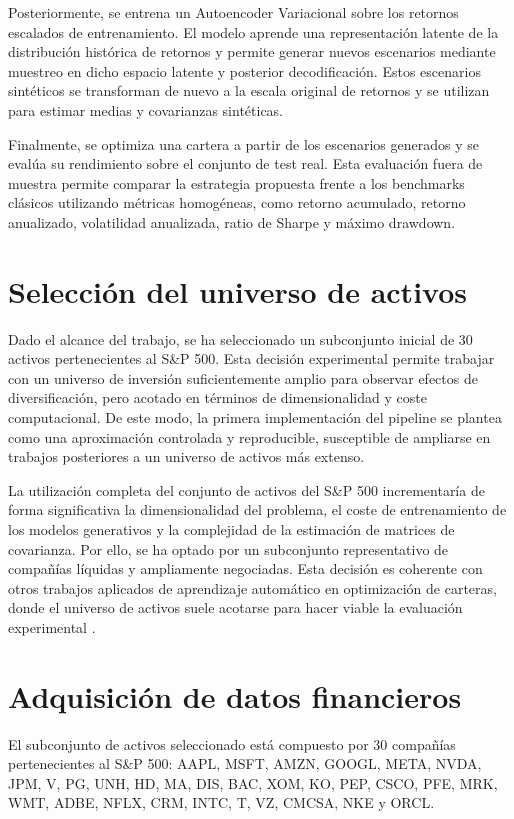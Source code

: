 Posteriormente, se entrena un Autoencoder Variacional sobre los retornos escalados de entrenamiento. El modelo aprende una representación latente de la distribución histórica de retornos y permite generar nuevos escenarios mediante muestreo en dicho espacio latente y posterior decodificación. Estos escenarios sintéticos se transforman de nuevo a la escala original de retornos y se utilizan para estimar medias y covarianzas sintéticas.

Finalmente, se optimiza una cartera a partir de los escenarios generados y se evalúa su rendimiento sobre el conjunto de test real. Esta evaluación fuera de muestra permite comparar la estrategia propuesta frente a los benchmarks clásicos utilizando métricas homogéneas, como retorno acumulado, retorno anualizado, volatilidad anualizada, ratio de Sharpe y máximo drawdown.

\section{Selección del universo de activos}

Dado el alcance del trabajo, se ha seleccionado un subconjunto inicial de 30 activos pertenecientes al S\&P 500. Esta decisión experimental permite trabajar con un universo de inversión suficientemente amplio para observar efectos de diversificación, pero acotado en términos de dimensionalidad y coste computacional. De este modo, la primera implementación del pipeline se plantea como una aproximación controlada y reproducible, susceptible de ampliarse en trabajos posteriores a un universo de activos más extenso.

La utilización completa del conjunto de activos del S\&P 500 incrementaría de forma significativa la dimensionalidad del problema, el coste de entrenamiento de los modelos generativos y la complejidad de la estimación de matrices de covarianza. Por ello, se ha optado por un subconjunto representativo de compañías líquidas y ampliamente negociadas. Esta decisión es coherente con otros trabajos aplicados de aprendizaje automático en optimización de carteras, donde el universo de activos suele acotarse para hacer viable la evaluación experimental \cite{zhang2020deep}.

\section{Adquisición de datos financieros}

El subconjunto de activos seleccionado está compuesto por 30 compañías pertenecientes al S\&P 500: AAPL, MSFT, AMZN, GOOGL, META, NVDA, JPM, V, PG, UNH, HD, MA, DIS, BAC, XOM, KO, PEP, CSCO, PFE, MRK, WMT, ADBE, NFLX, CRM, INTC, T, VZ, CMCSA, NKE y ORCL.

